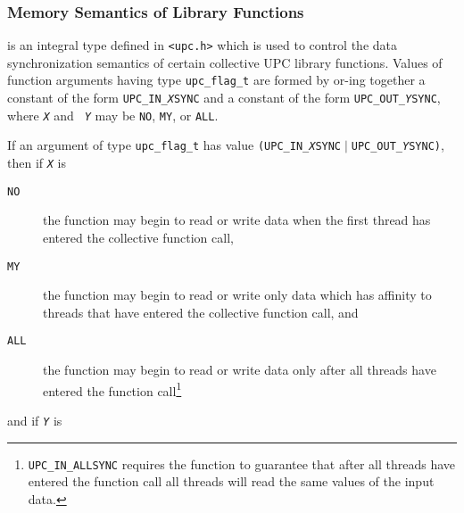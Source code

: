 \subsubsection{Memory Semantics of Library Functions}
\label{upc-flag-t}

 is an integral type defined in {\tt<upc.h>} which is used to
    control the data synchronization semantics of certain collective
    UPC library functions.  Values of function arguments
    having type {\tt upc\_flag\_t} are formed by or-ing together a
    constant of the form {\tt UPC\_IN\_{\em X}SYNC} and a constant of
    the form {\tt UPC\_OUT\_{\em Y}SYNC}, where {\tt {\em X}} and {\tt
    {\em Y}} may be {\tt NO}, {\tt MY}, or {\tt ALL}.

\np If an argument of type {\tt upc\_flag\_t} has value
    {\tt (UPC\_IN\_{\em X}SYNC}$\;|\;${\tt UPC\_OUT\_{\em Y}SYNC)},
    then if {\tt {\em X}} is

\begin{description}
    \item[{\tt NO}] the function may begin to read or write
    data when the first thread has entered the collective function call,

    \item[{\tt MY}] the function may begin to read or write only
    data which has affinity to threads that have entered the collective
    function call, and

    \item[{\tt ALL}] the function may begin to read or write
    data only after all threads have entered
    the function call\footnote{{\tt UPC\_IN\_ALLSYNC} requires the
    function to guarantee that
    after all threads have entered the function call all
    threads will read the same values of the input data.}
\end{description}

\np and if {\tt {\em Y}} is

